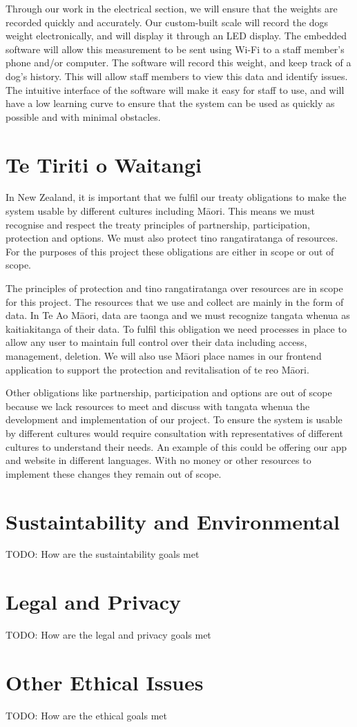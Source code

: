 Through our work in the electrical section, we will ensure that the weights are recorded quickly and accurately. Our custom-built scale will record the dogs weight electronically, and will display it through an LED display. The embedded software will allow this measurement to be sent using Wi-Fi to a staff member’s phone and/or computer. The software will record this weight, and keep track of a dog’s history. This will allow staff members to view this data and identify issues. The intuitive interface of the software will make it easy for staff to use, and will have a low learning curve to ensure that the system can be used as quickly as possible and with minimal obstacles. 


\section{Te Tiriti o Waitangi}

In New Zealand, it is important that we fulfil our treaty obligations to make the system usable by different cultures including Māori. This means we must recognise and respect the treaty principles of partnership, participation, protection and options. We must also protect tino rangatiratanga of resources. For the purposes of this project these obligations are either in scope or out of scope. 

The principles of protection and tino rangatiratanga over resources are in scope for this project. The resources that we use and collect are mainly in the form of data. In Te Ao Māori, data are taonga and we must recognize tangata whenua as kaitiakitanga of their data. To fulfil this obligation we need processes in place to allow any user to maintain full control over their data including access, management, deletion. We will also use Māori place names in our frontend application to support the protection and revitalisation of  te reo Māori.   

Other obligations like partnership, participation and options are out of scope because we lack resources to meet and discuss with tangata whenua the development and implementation of our project. To ensure the system is usable by different cultures would require consultation with representatives of different cultures to understand their needs. An example of this could be offering our app and website in different languages. With no money or other resources to implement these changes they remain out of scope. 


\section{Sustaintability and Environmental}

TODO: How are the sustaintability goals met

\section{Legal and Privacy}

TODO: How are the legal and privacy goals met

\section{Other Ethical Issues}

TODO: How are the ethical goals met


